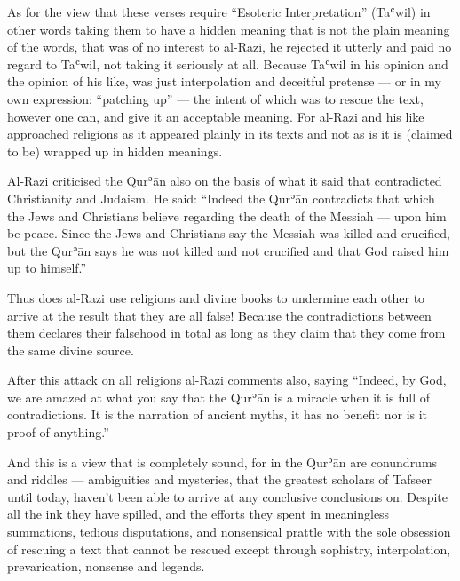 \documentclass[12pt]{memoir}
\def\´{ʾ} %
\def\`{ʿ} %
\def \Quran{Qur\-\´ān} %
\let \Qrn=\Quran      %
\def\–{-\hskip0pt}
\begin{document}
As for the view that these verses require “Esoteric Interpretation” (Ta\`wil)
in other words taking them to have a hidden meaning that is not the plain
meaning of the words, that was of no interest to al\–Razi, he rejected it
utterly and paid no regard to Ta\`wil, not taking it seriously at all.
Because Ta\`wil in his opinion and the opinion of his like, was just
interpolation and deceitful pretense — or in my own expression:
“patching up” — the intent of which was to rescue the text, however one can,
and give it an acceptable meaning.
For al\–Razi and his like approached religions as it appeared plainly
in its texts and not as is it is (claimed to be)
wrapped up in hidden meanings.\footnotemark


Al\–Razi criticised the \Qrn{} also on the basis of what it said that
contradicted Christianity and Judaism.
He said: “Indeed the \Qrn{} contradicts that which the Jews and Christians
believe regarding the death of the Messiah — upon him be peace.
Since the Jews and Christians say the Messiah was killed and crucified,
but the \Qrn{} says he was not killed and not crucified and that God
raised him up to himself.”\footnotemark


Thus does al\–Razi use religions and divine books to undermine each other
to arrive at the result that they are all false!
Because the contradictions between them declares their falsehood in total
as long as they claim that they come from the same divine source.

After this attack on all religions al\–Razi comments also, saying
“Indeed, by God, we are amazed at what you say that the \Qrn{} is a miracle
when it is full of contradictions.
It is the narration of ancient myths,
it has no benefit nor is it proof of anything.”\footnotemark


And this is a view that is completely sound,
for in the \Qrn{} are conundrums and riddles — ambiguities and mysteries,
that the greatest scholars of Tafseer until today,
haven’t been able to arrive at any conclusive conclusions on.
Despite all the ink they have spilled,
and the efforts they spent in meaningless summations, tedious disputations,
and nonsensical prattle with the sole obsession of rescuing a text
that cannot be rescued except through sophistry, interpolation,
prevarication, nonsense and legends.\footnotemark
\end{document}
